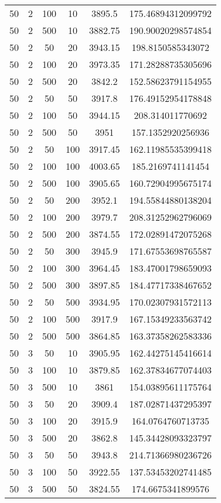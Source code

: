 {\begin{longtabu}{S
S
S
S
S[round-mode=places, round-precision=0]
S[round-mode=places, round-precision=0]}
50 & 2 & 100 & 10 & 3895.5 & 175.46894312099792 \\
50 & 2 & 500 & 10 & 3882.75 & 190.90020298574854 \\
50 & 2 & 50 & 20 & 3943.15 & 198.8150585343072 \\
50 & 2 & 100 & 20 & 3973.35 & 171.28288735305696 \\
50 & 2 & 500 & 20 & 3842.2 & 152.58623791154955 \\
50 & 2 & 50 & 50 & 3917.8 & 176.49152954178848 \\
50 & 2 & 100 & 50 & 3944.15 & 208.314011770692 \\
50 & 2 & 500 & 50 & 3951 & 157.1352920256936 \\
50 & 2 & 50 & 100 & 3917.45 & 162.11985535399418 \\
50 & 2 & 100 & 100 & 4003.65 & 185.2169741141454 \\
50 & 2 & 500 & 100 & 3905.65 & 160.72904995675174 \\
50 & 2 & 50 & 200 & 3952.1 & 194.55844880138204 \\
50 & 2 & 100 & 200 & 3979.7 & 208.31252962796069 \\
50 & 2 & 500 & 200 & 3874.55 & 172.02891472075268 \\
50 & 2 & 50 & 300 & 3945.9 & 171.67553698765587 \\
50 & 2 & 100 & 300 & 3964.45 & 183.47001798659093 \\
50 & 2 & 500 & 300 & 3897.85 & 184.47717338467652 \\
50 & 2 & 50 & 500 & 3934.95 & 170.02307931572113 \\
50 & 2 & 100 & 500 & 3917.9 & 167.15349233563742 \\
50 & 2 & 500 & 500 & 3864.85 & 163.37358262583336 \\
50 & 3 & 50 & 10 & 3905.95 & 162.44275145416614 \\
50 & 3 & 100 & 10 & 3879.85 & 162.37834677074403 \\
50 & 3 & 500 & 10 & 3861 & 154.03895611175764 \\
50 & 3 & 50 & 20 & 3909.4 & 187.02871437295397 \\
50 & 3 & 100 & 20 & 3915.9 & 164.0764760713735 \\
50 & 3 & 500 & 20 & 3862.8 & 145.34428093323797 \\
50 & 3 & 50 & 50 & 3943.8 & 214.71366980236726 \\
50 & 3 & 100 & 50 & 3922.55 & 137.53453202741485 \\
50 & 3 & 500 & 50 & 3824.55 & 174.6675341899576 \\

\end{longtabu}}
